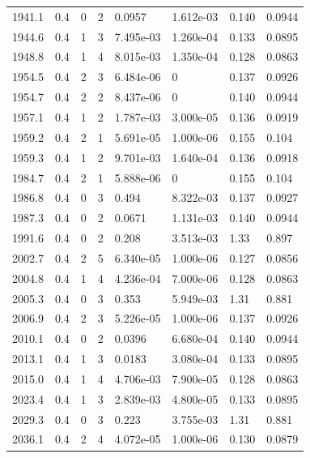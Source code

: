 \documentclass[preview]{standalone}
\begin{document}
{{{{{{{\begin{tabular}{L{1.2cm}C{1.2cm} C{0.3cm}C{0.5cm} C{1.4cm}C{1.4cm} C{1.4cm}C{1.4cm}}
  1941.1  &   0.4  & 0     &  2 &  0.0957  & 1.612e-03  & 0.140 &  0.0944   \\ 
  1944.6  &   0.4  & 1     &  3 &  7.495e-03  & 1.260e-04  & 0.133 &  0.0895   \\ 
  1948.8  &   0.4  & 1     &  4 &  8.015e-03  & 1.350e-04  & 0.128 &  0.0863   \\ 
  1954.5  &   0.4  & 2     &  3 &  6.484e-06  & 0  & 0.137 &  0.0926   \\ 
  1954.7  &   0.4  & 2     &  2 &  8.437e-06  & 0  & 0.140 &  0.0944   \\ 
  1957.1  &   0.4  & 1     &  2 &  1.787e-03  & 3.000e-05  & 0.136 &  0.0919   \\ 
  1959.2  &   0.4  & 2     &  1 &  5.691e-05  & 1.000e-06  & 0.155 &  0.104   \\ 
  1959.3  &   0.4  & 1     &  2 &  9.701e-03  & 1.640e-04  & 0.136 &  0.0918   \\ 
  1984.7  &   0.4  & 2     &  1 &  5.888e-06  & 0  & 0.155 &  0.104   \\ 
  1986.8  &   0.4  & 0     &  3 &  0.494  & 8.322e-03  & 0.137 &  0.0927   \\ 
  1987.3  &   0.4  & 0     &  2 &  0.0671  & 1.131e-03  & 0.140 &  0.0944   \\ 
  1991.6  &   0.4  & 0     &  2 &  0.208  & 3.513e-03  & 1.33 &  0.897   \\ 
  2002.7  &   0.4  & 2     &  5 &  6.340e-05  & 1.000e-06  & 0.127 &  0.0856   \\ 
  2004.8  &   0.4  & 1     &  4 &  4.236e-04  & 7.000e-06  & 0.128 &  0.0863   \\ 
  2005.3  &   0.4  & 0     &  3 &  0.353  & 5.949e-03  & 1.31 &  0.881   \\ 
  2006.9  &   0.4  & 2     &  3 &  5.226e-05  & 1.000e-06  & 0.137 &  0.0926   \\ 
  2010.1  &   0.4  & 0     &  2 &  0.0396  & 6.680e-04  & 0.140 &  0.0944   \\ 
  2013.1  &   0.4  & 1     &  3 &  0.0183  & 3.080e-04  & 0.133 &  0.0895   \\ 
  2015.0  &   0.4  & 1     &  4 &  4.706e-03  & 7.900e-05  & 0.128 &  0.0863   \\ 
  2023.4  &   0.4  & 1     &  3 &  2.839e-03  & 4.800e-05  & 0.133 &  0.0895   \\ 
  2029.3  &   0.4  & 0     &  3 &  0.223  & 3.755e-03  & 1.31 &  0.881   \\ 
  2036.1  &   0.4  & 2     &  4 &  4.072e-05  & 1.000e-06  & 0.130 &  0.0879   \\ 

\end{tabular}}}}}}}}
\end{document}
